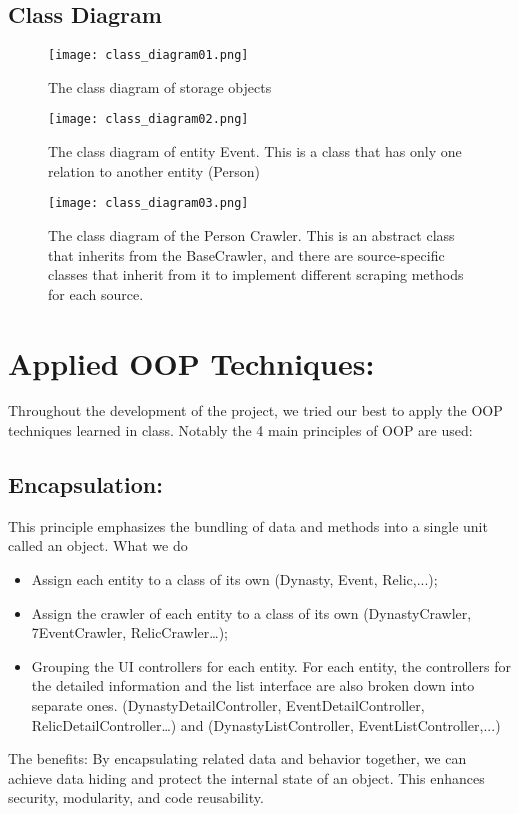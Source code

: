 \documentclass[a4paper,10pt,notitlepage]{article}
\begin{document}
{\subsection{Class Diagram}
    \begin{figure}[h]
        \centering
        \texttt{[image: class\_diagram01.png]}
        \caption{The class diagram of storage objects}
    \end{figure}
    \newpage
    \begin{figure}[h]
        \centering
        \texttt{[image: class\_diagram02.png]}
        \caption{ The class diagram of entity Event. This is a class that has only one relation to another entity (Person)}
    \end{figure}
   
    \begin{figure}[h]
        \centering
        \texttt{[image: class\_diagram03.png]}
        \caption{The class diagram of the Person Crawler. This is an abstract class that inherits from the BaseCrawler, and there are source-specific classes that inherit from it to implement different scraping methods for each source.}
    \end{figure}
 
\newpage
\section{\textbf{Applied OOP Techniques:}}
Throughout the development of the project, we tried our best to apply the OOP
techniques learned in class. Notably the 4 main principles of OOP are used:
\subsection{Encapsulation:}
This principle emphasizes the bundling of data and methods into a single unit
called an object.
What we do
\begin{itemize}
    \item Assign each entity to a class of its own (Dynasty, Event, Relic,...);
    \item Assign the crawler of each entity to a class of its own (DynastyCrawler, 7EventCrawler, RelicCrawler…);
    \item Grouping the UI controllers for each entity. For each entity, the controllers for the detailed information and the list interface are also broken down into separate ones. (DynastyDetailController, EventDetailController, RelicDetailController…) and (DynastyListController, EventListController,...)
\end{itemize}
The benefits:
By encapsulating related data and behavior together, we can achieve data
hiding and protect the internal state of an object. This enhances security,
modularity, and code reusability.
}
\end{document}

